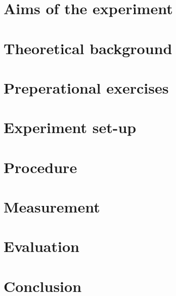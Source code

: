 \documentclass[a4paper, 12pt]{scrartcl}
\begin{document}
	\maketitle
	\tableofcontents
	\newpage
	\section{Aims of the experiment}
	
	\section{Theoretical background}
	
	\section{Preperational exercises}
	
	\section{Experiment set-up}
	
	\section{Procedure}
	
	\section{Measurement}
	
	\section{Evaluation}
	
	\section{Conclusion}
	
\end{document}
